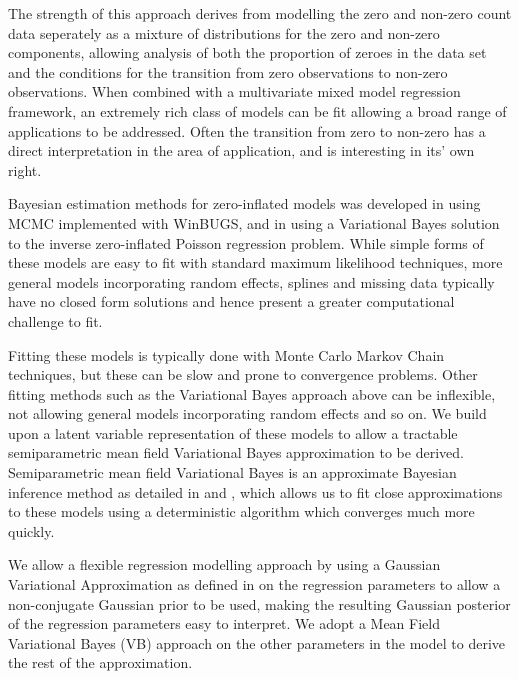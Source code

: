 \documentclass{amsart}[12pt]
\begin{document}
The strength of this approach derives from modelling the zero and non-zero count data seperately as a mixture
of distributions for the zero and non-zero components, allowing analysis of both the proportion of zeroes in
the data set and the conditions for the transition from zero observations to non-zero observations. When
combined with a multivariate mixed model regression framework, an extremely rich class of models can be fit
allowing a broad range of applications to be addressed. Often the transition from zero to non-zero has a
direct interpretation in the area of application, and is interesting in its' own right.

Bayesian estimation methods for zero-inflated models was developed in \citep{Ghosh2006} using MCMC 
implemented with WinBUGS, and in \citep{Vatsa2014} using a Variational Bayes solution to the inverse
zero-inflated Poisson regression problem. While simple forms of these models are easy to fit with standard 
maximum likelihood techniques, more general models incorporating random effects, splines and missing data 
typically have no closed form solutions and hence present a greater computational challenge to fit.

Fitting these models is typically done with Monte Carlo Markov Chain techniques, but these can be slow and
prone to convergence problems. Other fitting methods such as the Variational Bayes approach above can be
inflexible, not allowing general models incorporating random effects and so on. 
We build upon a latent variable representation of these models to allow a
tractable semiparametric mean field Variational Bayes approximation to be derived. Semiparametric mean field
Variational Bayes is an approximate Bayesian inference method as detailed in \citep{Ormerod2010} and
\citep{Rohde2015}, which allows us to fit close approximations to these models using a deterministic algorithm
which converges much more quickly.

We allow a flexible regression modelling approach by using a Gaussian Variational Approximation as defined in
\citep{Ormerod2012} on the regression parameters to allow a non-conjugate Gaussian prior to be used, making the
resulting Gaussian posterior of the regression parameters easy to interpret. We adopt a Mean Field Variational
Bayes (VB) approach on the other parameters in the model to derive the rest of the approximation.
\end{document}
